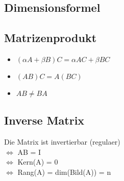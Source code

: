 \documentclass[a4paper,12pt]{article} %
\begin{document}
\subsection{Dimensionsformel}
\begin{center}
\end{center}
\subsection{Matrizenprodukt}
\begin{itemize}
\item $(\alpha A + \beta B)C = \alpha AC + \beta BC$
\item $(AB)C = A(BC)$
\item $AB \neq BA $
\end{itemize}
\subsection{Inverse Matrix}
\begin{center}
\end{center}
Die Matrix ist invertierbar (regulaer)\\
$\Leftrightarrow$ AB = I\\
$\Leftrightarrow$ Kern(A) = {0}\\
$\Leftrightarrow$ Rang(A) = dim(Bild(A)) = n
\end{document}
